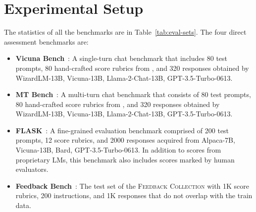 \documentclass[11pt]{article}
\begin{document}


\section{Experimental Setup}\label{experimental_setting}


The statistics of all the benchmarks are in Table~\ref{tab:eval-sets}. The four direct assessment benchmarks are:

\begin{itemize}
    \item \textbf{Vicuna Bench}~\citep{vicuna2023}: A single-turn chat benchmark that includes 80 test prompts, 80 hand-crafted score rubrics from \citet{kim2023prometheus}, and 320 responses obtained by WizardLM-13B, Vicuna-13B, Llama-2-Chat-13B, GPT-3.5-Turbo-0613.
    \item \textbf{MT Bench}~\citep{zheng2023judging}: A multi-turn chat benchmark that consists of 80 test prompts, 80 hand-crafted score rubrics from \citet{kim2023prometheus}, and 320 responses obtained by WizardLM-13B, Vicuna-13B, Llama-2-Chat-13B, GPT-3.5-Turbo-0613.
    \item \textbf{FLASK}~\citep{ye2023flask}: A fine-grained evaluation benchmark comprised of 200 test prompts, 12 score rubrics, and 2000 responses acquired from Alpaca-7B, Vicuna-13B, Bard, GPT-3.5-Turbo-0613. In addition to scores from proprietary LMs, this benchmark also includes scores marked by human evaluators.
    \item \textbf{Feedback Bench}~\citep{kim2023prometheus}: The test set of the \textsc{Feedback Collection} with 1K score rubrics, 200 instructions, and 1K responses that do not overlap with the train data.
\end{itemize}
\end{document}
